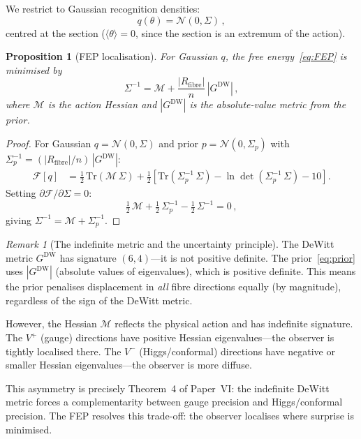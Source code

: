 \documentclass[12pt, a4paper]{article}
\newtheorem{proposition}[theorem]{Proposition}
\theoremstyle{definition}
\theoremstyle{remark}
\newtheorem{remark}[theorem]{Remark}
\newcommand{\Tr}{\mathrm{Tr}}
\newcommand{\Rfibre}{R_{\mathrm{fibre}}}
\begin{document}
We restrict to Gaussian recognition densities:
\begin{equation}
q(\theta) = \mathcal{N}(0, \Sigma)\,,
\end{equation}
centred at the section ($\langle\theta\rangle = 0$, since the section is an extremum of the action).

\begin{proposition}[FEP localisation]
\label{prop:localisation}
For Gaussian $q$, the free energy~\eqref{eq:FEP} is minimised by
\begin{equation}
\label{eq:Sigma_opt}
\Sigma^{-1} = \mathcal{M} + \frac{|\Rfibre|}{n}\, |G^{\mathrm{DW}}|\,,
\end{equation}
where $\mathcal{M}$ is the action Hessian and $|G^{\mathrm{DW}}|$ is the absolute-value metric from the prior.
\end{proposition}

\begin{proof}
For Gaussian $q = \mathcal{N}(0, \Sigma)$ and prior
$p = \mathcal{N}(0, \Sigma_p)$ with
$\Sigma_p^{-1} = (|\Rfibre|/n)\,|G^{\mathrm{DW}}|$:
\begin{align}
\mathcal{F}[q] &= \tfrac{1}{2}\, \Tr(\mathcal{M}\, \Sigma) + \tfrac{1}{2}\left[\Tr(\Sigma_p^{-1}\, \Sigma) - \ln\det(\Sigma_p^{-1}\, \Sigma) - 10\right]. \label{eq:F_gaussian}
\end{align}
Setting $\partial \mathcal{F}/\partial \Sigma = 0$:
\begin{equation}
\tfrac{1}{2}\, \mathcal{M} + \tfrac{1}{2}\, \Sigma_p^{-1} - \tfrac{1}{2}\, \Sigma^{-1} = 0\,,
\end{equation}
giving $\Sigma^{-1} = \mathcal{M} + \Sigma_p^{-1}$.
\end{proof}

\begin{remark}[The indefinite metric and the uncertainty principle]
The DeWitt metric $G^{\mathrm{DW}}$ has signature $(6,4)$---it is not positive definite.
The prior~\eqref{eq:prior} uses $|G^{\mathrm{DW}}|$ (absolute values of eigenvalues), which is positive definite.
This means the prior penalises displacement in \emph{all} fibre directions equally (by magnitude), regardless of the sign of the DeWitt metric.

However, the Hessian $\mathcal{M}$ reflects the physical action and has indefinite signature.
The $V^+$ (gauge) directions have positive Hessian eigenvalues---the observer is tightly localised there.
The $V^-$ (Higgs/conformal) directions have negative or smaller Hessian eigenvalues---the observer is more diffuse.

This asymmetry is precisely Theorem~4 of Paper~VI: the indefinite DeWitt metric forces a complementarity between gauge precision and Higgs/conformal precision.
The FEP resolves this trade-off: the observer localises where surprise is minimised.
\end{remark}
\end{document}
